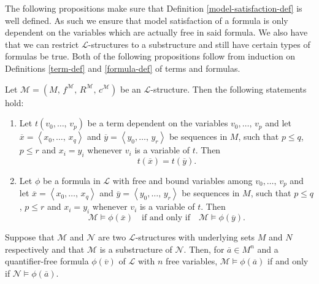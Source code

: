 \documentclass[../../main.tex]{subfiles}
\begin{document}
The following propositions make sure that Definition \ref{model-satisfaction-def} is well defined.
As such we ensure that model satisfaction of a formula is only dependent on the variables which are actually free in said formula.
We also have that we can restrict $\mathcal{L}$-structures to a substructure and still have certain types of formulas be true.
Both of the following propositions follow from induction on Definitions \ref{term-def} and \ref{formula-def} of terms and formulas.

\begin{proposition}\cite[Proposition 1.3.16]{Cha90}
    Let $\mathcal{M} = \left(M,\, f^{\mathcal{M}},\, R^{\mathcal{M}},\, c^{\mathcal{M}}\right)$ be an $\mathcal{L}$-structure.
    Then the following statements hold:
    \begin{enumerate}
        \item Let $t(v_0,\ldots,\, v_p)$ be a term dependent on the variables $v_0,\ldots,\, v_p$ and let $\overline{x} = \left<x_0,\ldots,\, x_q\right>$ and $\overline{y} = \left<y_0,\ldots,\, y_r\right>$ be sequences in $M$,
        such that $p \leq q$, $p \leq r$ and $x_i = y_i$ whenever $v_i$ is a variable of $t$.
        Then $$t(\overline{x}) = t(\overline{y}).$$
        \item Let $\phi$ be a formula in $\mathcal{L}$ with free and bound variables among $v_0,\ldots,\, v_p$ and let $\overline{x} = \left<x_0,\ldots,\, x_q\right>$ and $\overline{y} = \left<y_0,\ldots,\, y_r\right>$ be sequences in $M$,
        such that $p \leq q$, $p \leq r$ and $x_i = y_i$ whenever $v_i$ is a variable of $t$.
        Then $$\mathcal{M} \models \phi(\overline{x}) \quad \text{if and only if} \quad \mathcal{M} \models \phi(\overline{y}).$$
    \end{enumerate}
\end{proposition}

\begin{proposition}\cite[Proposition 1.1.8]{Mar02}
        Suppose that $\mathcal{M}$ and $\mathcal{N}$ are two $\mathcal{L}$-structures with underlying sets $M$ and $N$ respectively and that $\mathcal{M}$ is a substructure of $\mathcal{N}$.
        Then, for $\overline{a} \in M^n$ and a quantifier-free formula $\phi(\overline{v})$ of $\mathcal{L}$ with $n$ free variables,
        $\mathcal{M} \models \phi(\overline{a})$ if and only if $\mathcal{N} \models \phi(\overline{a})$.
\end{proposition}

% 
% 
%
\end{document}
